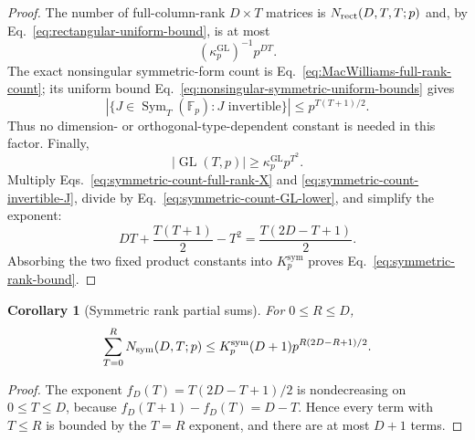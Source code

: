 \documentclass[11pt]{article}
\newcommand{\F}{\mathbb F}
\newcommand{\Sym}{\operatorname{Sym}}
\newcommand{\1}{\mathbf 1}
\theoremstyle{plain}
\newtheorem{corollary}[theorem]{Corollary}
\theoremstyle{definition}
\theoremstyle{remark}
\begin{document}
\begin{proof}
The number of full-column-rank $D\times T$ matrices is
$N_{\rm rect}(D,T,T;p)$ and, by Eq.~\eqref{eq:rectangular-uniform-bound}, is at
most
\begin{equation}
 (\kappa_p^{\mathrm{GL}})^{-1}p^{DT}.
 \label{eq:symmetric-count-full-rank-X}
\end{equation}
The exact nonsingular symmetric-form count is
Eq.~\eqref{eq:MacWilliams-full-rank-count}; its uniform bound
Eq.~\eqref{eq:nonsingular-symmetric-uniform-bounds} gives
\begin{equation}
 |\{J\in\Sym_T(\F_p):J\text{ invertible}\}|
 \le p^{T(T+1)/2}.
 \label{eq:symmetric-count-invertible-J}
\end{equation}
Thus no dimension- or orthogonal-type-dependent constant is needed in this
factor.  Finally,
\begin{equation}
 |\operatorname{GL}(T,p)|
 \ge\kappa_p^{\mathrm{GL}}p^{T^2}.
 \label{eq:symmetric-count-GL-lower}
\end{equation}
Multiply Eqs.~\eqref{eq:symmetric-count-full-rank-X} and
\eqref{eq:symmetric-count-invertible-J}, divide by
Eq.~\eqref{eq:symmetric-count-GL-lower}, and simplify the exponent:
\begin{equation}
 DT+\frac{T(T+1)}2-T^2
 =\frac{T(2D-T+1)}2.
 \label{eq:symmetric-rank-exponent-assembly}
\end{equation}
Absorbing the two fixed product constants into $K_p^{\mathrm{sym}}$ proves
Eq.~\eqref{eq:symmetric-rank-bound}.
\end{proof}

\begin{corollary}[Symmetric rank partial sums]
\label{cor:symmetric-rank-partial-sum}
For $0\le R\le D$,
\begin{equation}
 \sum_{T=0}^R N_{\rm sym}(D,T;p)
 \le K_p^{\mathrm{sym}}(D+1)p^{R(2D-R+1)/2}.
 \label{eq:symmetric-partial-sum}
\end{equation}
\end{corollary}

\begin{proof}
The exponent $f_D(T)=T(2D-T+1)/2$ is nondecreasing on $0\le T\le D$, because $f_D(T+1)-f_D(T)=D-T$.  Hence every term with $T\le R$ is bounded by the $T=R$ exponent, and there are at most $D+1$ terms.
\end{proof}
\end{document}
